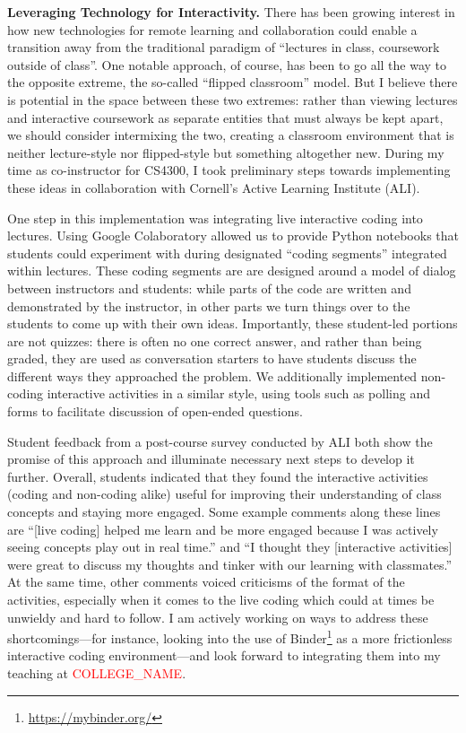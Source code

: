 \documentclass[11pt,letterpaper]{article}
\renewcommand{\section}[1]{\vspace{0.25\baselineskip}\noindent\textbf{#1.}}
\newcommand{\schoolname}{\textcolor{red}{COLLEGE\_NAME}} %
\begin{document}
\section{Leveraging Technology for Interactivity}
There has been growing interest in how new technologies for remote learning and collaboration could enable a transition away from the traditional paradigm of ``lectures in class, coursework outside of class''.
One notable approach, of course, has been to go all the way to the opposite extreme, the so-called ``flipped classroom'' model.
But I believe there is potential in the space between these two extremes: rather than viewing lectures and interactive coursework as separate entities that must always be kept apart, we should consider intermixing the two, creating a classroom environment that is neither lecture-style nor flipped-style but something altogether new.
During my time as co-instructor for CS4300, I took preliminary steps towards implementing these ideas in collaboration with Cornell's Active Learning Institute (ALI).

One step in this implementation was integrating live interactive coding into lectures.
Using Google Colaboratory allowed us to provide Python notebooks that students could experiment with during designated ``coding segments'' integrated within lectures.
These coding segments are are designed around a model of dialog between instructors and students: while parts of the code are written and demonstrated by the instructor, in other parts we turn things over to the students to come up with their own ideas.
Importantly, these student-led portions are not quizzes: there is often no one correct answer, and rather than being graded, they are used as conversation starters to have students discuss the different ways they approached the problem.
We additionally implemented non-coding interactive activities in a similar style, using tools such as polling and forms to facilitate discussion of open-ended questions.

Student feedback from a post-course survey conducted by ALI both show the promise of this approach and illuminate necessary next steps to develop it further.
Overall, students indicated that they found the interactive activities (coding and non-coding alike) useful for improving their understanding of class concepts and staying more engaged.
Some example comments along these lines are ``[live coding] helped me learn and be more engaged because I was actively seeing concepts play out in real time.'' and ``I thought they [interactive activities] were great to discuss my thoughts and tinker with our learning with classmates.''
At the same time, other comments voiced criticisms of the format of the activities, especially when it comes to the live coding which could at times be unwieldy and hard to follow.
I am actively working on ways to address these shortcomings---for instance, looking into the use of Binder\footnote{\url{https://mybinder.org/}} as a more frictionless interactive coding environment---and look forward to integrating them into my teaching at \schoolname.
\end{document}
